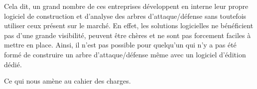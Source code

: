         Cela dit, un grand nombre de ces entreprises développent en interne leur propre logiciel de construction et d'analyse des arbres d'attaque/défense sans toutefois utiliser ceux présent sur le marché. En effet, les solutions logicielles ne bénéficient pas d'une grande visibilité, peuvent être chères et ne sont pas forcement faciles à mettre en place. Ainsi, il n'est pas possible pour quelqu'un qui n'y a pas été formé de construire un arbre d'attaque/défense même avec un logiciel d'édition dédié.

        Ce qui nous amène au cahier des charges.


